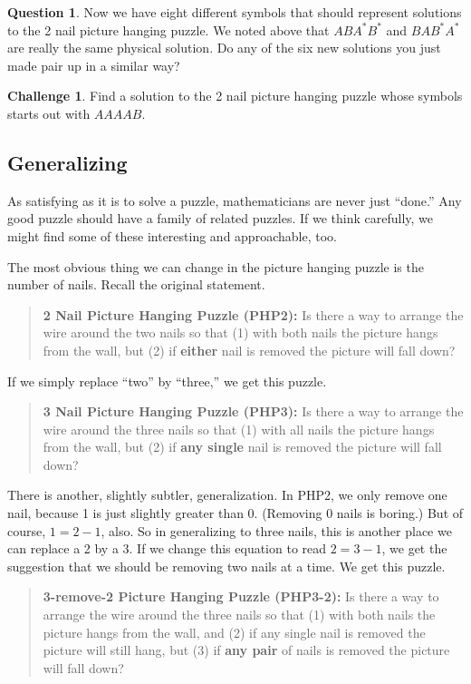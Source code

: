 \documentclass[12pt,letterpaper]{article}
\theoremstyle{definition}
\newtheorem{question}{Question}
\newtheorem*{challenge}{Challenge}
\begin{document}
\begin{question}
Now we have eight different symbols that should represent solutions to the 2 nail picture hanging puzzle.
We noted above that $ABA^*B^*$ and $BAB^*A^*$ are really the same physical solution.
Do any of the six new solutions you just made pair up in a similar way?
\end{question}

\begin{challenge}
Find a solution to the 2 nail picture hanging puzzle whose symbols starts out with $AAAAB$.
\end{challenge}

\subsection*{Generalizing}

As satisfying as it is to solve a puzzle, mathematicians are never just ``done.''
Any good puzzle should have a family of related puzzles. If we think carefully, we might find some of these interesting and approachable, too.

The most obvious thing we can change in the picture hanging puzzle is the number of nails.
Recall the original statement.
\begin{quotation}
\noindent
\textbf{2 Nail Picture Hanging Puzzle (PHP2):} Is there a way to arrange the wire around the two nails so that (1) with both nails the picture hangs from the wall, but (2) if \textbf{either} nail is removed the picture will fall down?
\end{quotation}

If we simply replace ``two'' by ``three,'' we get this puzzle.
\begin{quotation}
\noindent
\textbf{3 Nail Picture Hanging Puzzle (PHP3):} Is there a way to arrange the wire around the three nails so that (1) with all nails the picture hangs from the wall, but (2) if \textbf{any single} nail is removed the picture will fall down?
\end{quotation}

There is another, slightly subtler, generalization.
In PHP2, we only remove one nail, because 1 is just slightly greater than 0.
(Removing 0 nails is boring.)
But of course, $1=2-1$, also.
So in generalizing to three nails, this is another place we can replace a 2 by a 3.
If we change this equation to read $2 = 3 -1$, we get the suggestion that we should be removing two nails at a time.
We get this puzzle.
\begin{quotation}
\noindent
\textbf{3-remove-2 Picture Hanging Puzzle (PHP3-2):} Is there a way to arrange the wire around the three nails so that (1) with both nails the picture hangs from the wall, and (2) if any single nail is removed the picture will still hang, but (3) if \textbf{any pair} of nails is removed the picture will fall down?
\end{quotation}
\end{document}

